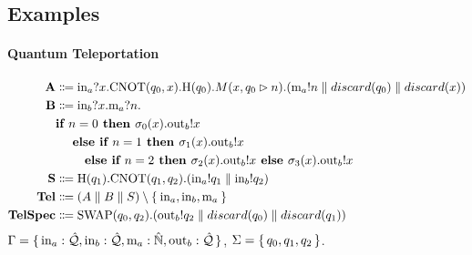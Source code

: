   
\subsection{Examples}
  \paragraph{Quantum Teleportation}

\begin{align*}
  \proc{A} &\Coloneqq \text{in}_a?x.\text{CNOT}(q_0, x).\text{H}(q_0).M(x,q_0 \rhd n).(\text{m}_a!n \parallel discard(q_0) \parallel discard(x) )\\
  \proc{B} &\Coloneqq \text{in}_b?x.\text{m}_a?n.
     \\ & \ite{n = 0}{\sigma_0(x).\text{out}_b!x\\&\quad}
    {\ite{n = 1}{\sigma_1(x).\text{out}_b!x\\&\qquad}
    		{\ite{n = 2}{\sigma_2(x).\text{out}_b!x}{\sigma_3(x).\text{out}_b!x}}
    }
\\
  \proc{S} &\Coloneqq \text{H}(q_1).\text{CNOT}(q_1, q_2).(\text{in}_a!q_1 \parallel \text{in}_b!q_2) \\
  \proc{Tel} &\Coloneqq (A \parallel B \parallel S) \setminus \Set{\text{in}_a, \text{in}_b, \text{m}_a } \\
  \proc{TelSpec} &\Coloneqq \text{SWAP}(q_0,q_2).(\text{out}_b!q_2 \parallel discard(q_0) \parallel discard(q_1))
\end{align*}
$\Gamma = \set{\text{in}_a : \hat{\mathcal{Q}}, \text{in}_b : \hat{\mathcal{Q}}, \text{m}_a : \hat{\mathbb{N}}, \text{out}_b : \hat{\mathcal{Q}}}$, $\Sigma = \set{q_0, q_1, q_2}$.